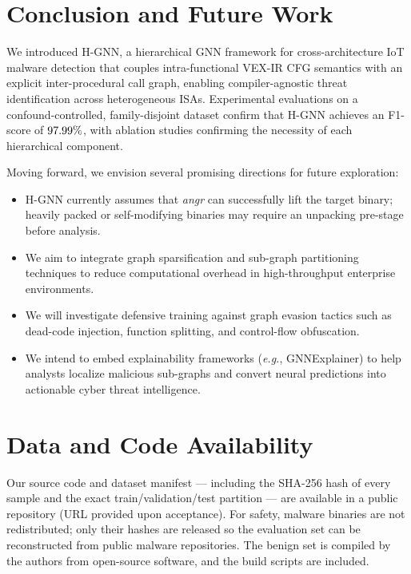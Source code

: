 \documentclass{llncs}
\newcommand{\method}{H-GNN}
\begin{document}
\section{Conclusion and Future Work}
\label{sec:conclusion}

We introduced \method{}, a hierarchical GNN framework for cross-architecture
IoT malware detection that couples intra-functional VEX-IR CFG semantics
with an explicit inter-procedural call graph, enabling compiler-agnostic
threat identification across heterogeneous ISAs.
Experimental evaluations on a confound-controlled, family-disjoint
dataset confirm that \method{} achieves an F1-score of $97.99\%$, with
ablation studies confirming the necessity of each hierarchical component.

Moving forward, we envision several promising directions for future exploration:
\begin{itemize}
    \item {} \method{} currently assumes that \textit{angr}
    can successfully lift the target binary; heavily packed or self-modifying
    binaries may require an unpacking pre-stage before analysis.
    \item {} We aim to integrate
    graph sparsification and sub-graph partitioning techniques to reduce
    computational overhead in high-throughput enterprise environments.
    \item {} We will investigate defensive
    training against graph evasion tactics such as dead-code injection,
    function splitting, and control-flow obfuscation.
    \item {} We intend
    to embed explainability frameworks (\textit{e.g.}, GNNExplainer) to help
    analysts localize malicious sub-graphs and convert neural predictions into
    actionable cyber threat intelligence.
\end{itemize}


\section*{Data and Code Availability}
Our source code and dataset manifest --- including the SHA-256 hash of every sample and the exact
train/validation/test partition --- are available in a public repository (URL provided upon acceptance). For safety, malware binaries
are not redistributed; only their hashes are released so the evaluation set can be reconstructed from
public malware repositories. The benign set is compiled by the authors from open-source software, and
the build scripts are included.




\end{document}
